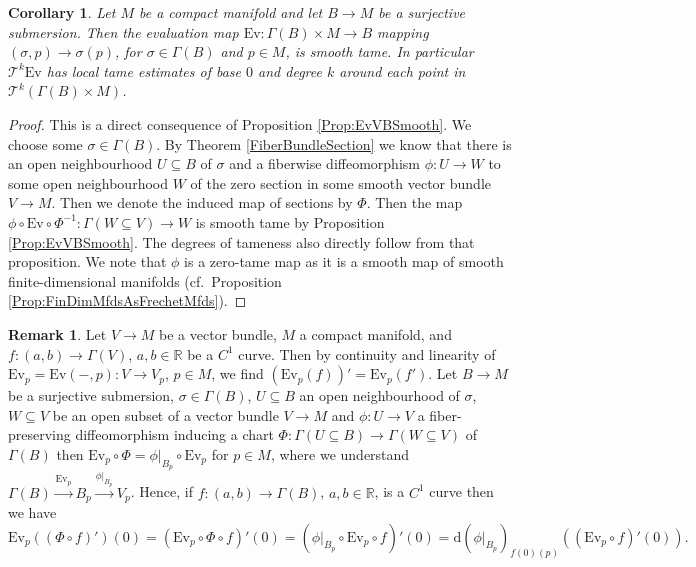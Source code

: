 \documentclass[12pt,a4paper]{article}
\theoremstyle{plain}
\newtheorem{corollary}[theorem]{Corollary}
\theoremstyle{definition}
\newtheorem{remark}[theorem]{Remark}
\newcommand{\R}{\mathbb{R}}
\newcommand{\Ev}{\mathrm{Ev}}
\renewcommand{\d}{\mathrm{d}}
\begin{document}
\begin{corollary}
\label{Cor:EvFBSmooth}
Let $M$ be a compact manifold and let $B\to M$ be a surjective submersion. Then the evaluation map $\mathrm{Ev}:\Gamma(B)\times M\to B$ mapping $(\sigma,p)\to \sigma(p)$, for $\sigma\in \Gamma(B)$ and $p\in M$, is smooth tame. In particular $\mathcal T^k\mathrm{Ev}$ has local tame estimates of base $0$ and degree $k$ around each point in $\mathcal T^k(\Gamma(B)\times M)$.
\end{corollary}
\begin{proof}
This is a direct consequence of Proposition \ref{Prop:EvVBSmooth}. We choose some $\sigma\in\Gamma(B)$. By Theorem \ref{FiberBundleSection} we know that there is an open neighbourhood $U\subseteq B$ of $\sigma$ and a fiberwise diffeomorphism $\phi:U\to W$ to some open neighbourhood $W$ of the zero section in some smooth vector bundle $V\to M$. Then we denote the induced map of sections by $\Phi$. Then the map $\phi\circ \mathrm{Ev}\circ \Phi^{-1}:\Gamma(W\subseteq V)\to W$ is smooth tame by Proposition \ref{Prop:EvVBSmooth}. The degrees of tameness also directly follow from that proposition. We note that $\phi$ is a zero-tame map as it is a smooth map of smooth finite-dimensional manifolds (cf.~Proposition \ref{Prop:FinDimMfdsAsFrechetMfds}). 
\end{proof}

\begin{remark}
\label{Rem:Ev Phi=phi_p Ev}
Let $V\to M$ be a vector bundle, $M$ a compact manifold, and 
$f:(a,b)\to \Gamma(V)$, $a,b\in \R$ be a $C^1$ curve. Then by continuity and linearity of
$\Ev_p=\Ev(-,p):V\to V_p$, $p\in M$, we find $(\Ev_p(f))'=\Ev_p(f')$. Let $B\to M$ be a surjective submersion, $\sigma\in \Gamma(B)$, $U\subseteq B$ an open neighbourhood of $\sigma$, $W\subseteq V$ be an open subset of a vector bundle $V\to M$ and $\phi:U\to V$ a fiber-preserving diffeomorphism inducing a chart $\Phi:\Gamma(U\subseteq B)\to \Gamma(W\subseteq V)$ of $\Gamma(B)$ then $\Ev_p\circ \Phi=\left.\phi\right|_{B_p}\circ \Ev_p$ for $p\in M$, where we understand $\Gamma(B)\xrightarrow{\Ev_p}B_p\xrightarrow{\left.\phi\right|_{B_p}}V_p$. Hence, if $f:(a,b)\to \Gamma(B)$, $a,b\in \R$, is a $C^1$ curve then we have
$$\Ev_p((\Phi\circ f)')(0)=(\Ev_p\circ \Phi \circ f)'(0)=(\left.\phi\right|_{B_p}\circ \Ev_p\circ f)'(0)=\d(\left.\phi\right|_{B_p})_{f(0)(p)}((\Ev_p\circ f)'(0)).$$ 
\end{remark}
\end{document}
